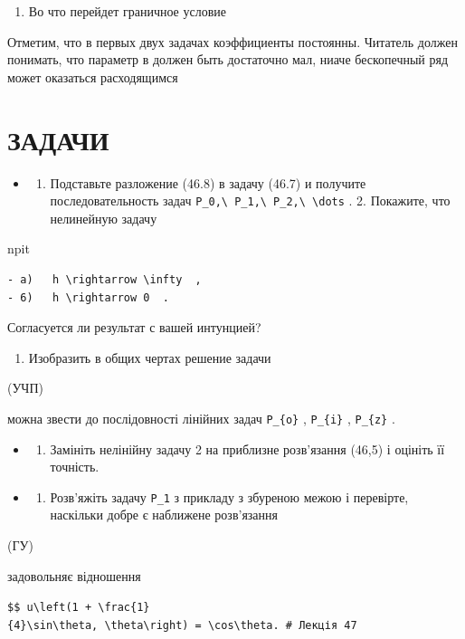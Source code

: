 \documentclass[
  ukrainian,
]{article}
\providecommand{\tightlist}{%
  \setlength{\itemsep}{0pt}\setlength{\parskip}{0pt}}
\begin{document}
\begin{enumerate}
\def\labelenumi{\arabic{enumi}.}
\setcounter{enumi}{2}
\tightlist
\item
  Во что перейдет граничное условие
\end{enumerate}

Отметим, что в первых двух задачах коэффициенты постоянны. Читатель
должен понимать, что параметр в должен быть достаточно мал, ниаче
бескопечный ряд может оказаться расходящимся

\section{ЗАДАЧИ}\label{ux437ux430ux434ux430ux447ux438-3}

\begin{itemize}
\tightlist
\item
  \begin{enumerate}
  \def\labelenumi{\arabic{enumi}.}
  \tightlist
  \item
    Подставьте разложение (46.8) в задачу (46.7) и получите
    последовательность задач
    \texttt{P\_0,\textbackslash{}\ P\_1,\textbackslash{}\ P\_2,\textbackslash{}\ \textbackslash{}dots}
    . 2. Покажите, что нелинейную задачу
  \end{enumerate}
\end{itemize}

npit

\begin{verbatim}
- a)   h \rightarrow \infty  ,
- 6)   h \rightarrow 0  .
\end{verbatim}

Согласуется ли результат с вашей интунцией?

\begin{enumerate}
\def\labelenumi{\arabic{enumi}.}
\setcounter{enumi}{3}
\tightlist
\item
  Изобразить в общих чертах решение задачи
\end{enumerate}

(УЧП)

можна звести до послідовності лінійних задач \texttt{P\_\{o\}} ,
\texttt{P\_\{i\}} , \texttt{P\_\{z\}} .

\begin{itemize}
\tightlist
\item
  \begin{enumerate}
  \def\labelenumi{\arabic{enumi}.}
  \setcounter{enumi}{2}
  \tightlist
  \item
    Замініть нелінійну задачу 2 на приблизне розв'язання (46,5) і
    оцініть її точність.
  \end{enumerate}
\item
  \begin{enumerate}
  \def\labelenumi{\arabic{enumi}.}
  \setcounter{enumi}{3}
  \tightlist
  \item
    Розв'яжіть задачу \texttt{P\_1} з прикладу з збуреною межою і
    перевірте, наскільки добре є наближене розв'язання
  \end{enumerate}
\end{itemize}

(ГУ)

задовольняє відношення

\texttt{\$\$\ \textquotesingle{}u\textbackslash{}left(1\ +\ \textbackslash{}frac\{1\}\{4\}\textbackslash{}sin\textbackslash{}theta,\ \textbackslash{}theta\textbackslash{}right)\ =\ \textbackslash{}cos\textbackslash{}theta.\textquotesingle{}\ \#\ Лекція\ 47}
\end{document}
